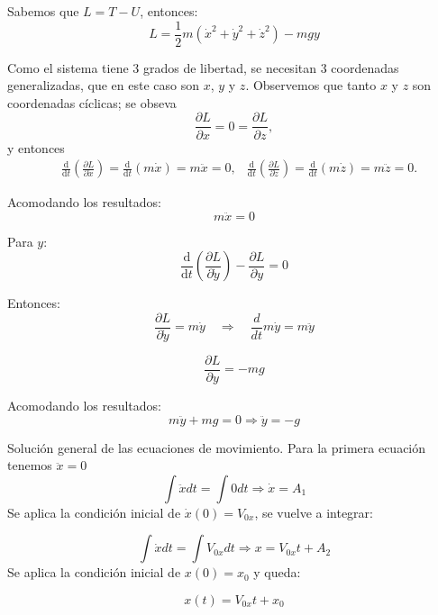 \documentclass{article}
\begin{document}
Sabemos que $L=T-U$, entonces:
\begin{equation}
    L= \frac{1}{2}m( \dot{x}^2 + \dot{y}^2 + \dot{z}^2) - mgy
\end{equation}

Como el sistema tiene 3 grados de libertad, se necesitan 3 coordenadas generalizadas, que en este caso son $x$, $y$ y $z$. Observemos que tanto $x$ y $z$ son coordenadas c\'iclicas; se obseva
\begin{equation}
    \frac{\partial L}{\partial x} = 0 = \frac{\partial L}{\partial z},
\end{equation}
y entonces
\begin{align}
    &\frac{\mathrm{d}}{\mathrm{d}t}\left(\frac{\partial L}{\partial \dot{x}}\right) = \frac{\mathrm{d}}{\mathrm{d}t}(m\dot{x}) = m\ddot{x} = 0,
    &\frac{\mathrm{d}}{\mathrm{d}t}\left(\frac{\partial L}{\partial \dot{z}}\right) = \frac{\mathrm{d}}{\mathrm{d}t}(m\dot{z}) = m\ddot{z} = 0.
\end{align}

Acomodando los resultados:
\begin{equation}
   m\ddot{x}=0
\end{equation}

Para $y$:
\begin{equation}
   \frac{\mathrm{d}}{\mathrm{d}t} \left(\frac{\partial L}{\partial \dot{y}}\right) -\frac{\partial L}{\partial y}= 0
\end{equation}

Entonces:
\[
 \frac{\partial L}{\partial \dot{y}}= m\dot{y}  \quad\Longrightarrow\quad  \frac{d}{dt} m\dot{y}= m\ddot{y}
\]

\[
   \frac{\partial L}{\partial y}= -mg
\]

Acomodando los resultados:
\begin{equation}
   m\ddot{y}+ mg =0 \Longrightarrow \ddot{y}=-g
\end{equation}

Solución general de las ecuaciones de movimiento. Para la primera ecuación tenemos $\ddot{x}=0$
\[
\int \ddot{x} dt = \int 0 dt \Longrightarrow \dot{x} = A_1 
\]
Se aplica la condición inicial de $\dot{x} (0)=V_{0x}$, se vuelve a integrar:

\[
\int \dot{x} dt = \int V_{0x} dt \Longrightarrow x = V_{0x} t + A_2 
\]
Se aplica la condición inicial de $x(0)=x_{0}$ y queda:

\begin{equation}
   x(t) = V_{0x} t + x_0
\end{equation}
\end{document}
